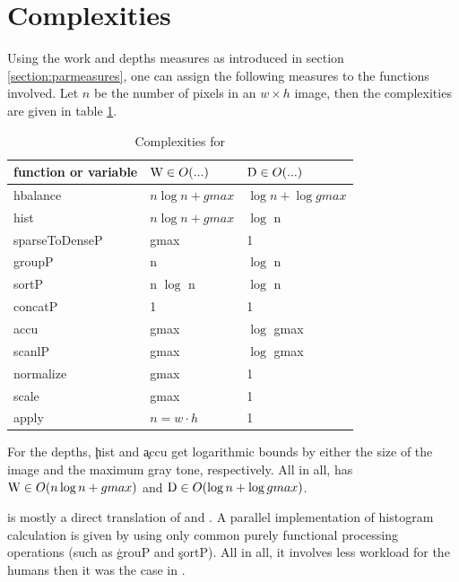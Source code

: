\section{Complexities}
  Using the work and depths measures as introduced in section \ref{section:parmeasures},
  one can assign the following measures to the functions involved.
  Let $n$ be the number of pixels in an $w \times h$ image,
  then the complexities are given in table \ref{complexities:ndpn}.
  \begin{table}[h!]
    \caption{Complexities for \ndpn}
    \label{complexities:ndpn}
    \begin{center}
    \begin{tabular}{lll}
        \toprule
        function or variable & $\textrm{W} \in O(...)$           & $\textrm{D} \in O(...)$ \\
        \midrule
        hbalance        & $n \log n + gmax$   & $\log n + \log gmax$\\
        \midrule
        hist            & $n \log n + gmax$    & $\log$ n \\
        sparseToDenseP  & gmax                 & 1 \\
        groupP          & n                    & $\log$ n \\
        sortP           & n $\log$ n             & $\log$ n \\
        concatP         & 1                    & 1 \\
        \midrule
        accu            & gmax                 & $\log$ gmax \\
        scanlP          & gmax                 & $\log$ gmax \\
        \midrule
        normalize       & gmax                 & 1 \\
        scale           & gmax                 & 1 \\
        \midrule
        apply           & $n = w \cdot h$ & 1 \\
    \end{tabular}
    \end{center}
  \end{table}
    For the depths, \c{hist} and \c{accu} get logarithmic bounds by
    either the size of the image and the maximum gray tone, respectively.
    All in all, \ndpn has $\textrm{W} \in O(n \log n + gmax)$
    and $\textrm{D} \in O(\log n + \log gmax)$.
    
    \ndpn is mostly a direct translation of \seq and \algo.
    A parallel implementation of histogram calculation is given
    by using only common purely functional processing operations (such as \c{grouP} and \c{sortP}).
    All in all, it involves less workload for the humans then it was
    the case in \man.
    
